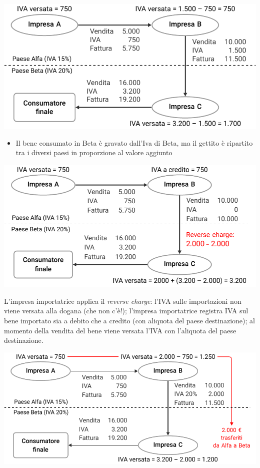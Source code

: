 \documentclass[11pt,italian]{beamer}
\begin{document}
\begin{frame}
\begin{center}
\includegraphics[width=.9\textwidth]{./figure/IVA-origine.pdf}
\end{center}

\begin{itemize}
\item Il bene consumato in Beta è gravato dall'Iva di Beta, ma il gettito è
ripartito tra i diversi paesi in proporzione al valore aggiunto
\end{itemize}
\end{frame}

\begin{frame}
\begin{center}
\includegraphics[width=.9\textwidth]{./figure/IVA-intracomunitaria.pdf}
\end{center}

\footnotesize
L'impresa importatrice applica il \emph{reverse charge}: l'IVA sulle importazioni
non viene versata alla dogana (che non c'è!); l'impresa importatrice registra
IVA sul bene importato sia a debito che a credito (con aliquota del paese
destinazione); al momento della vendita del bene viene versata l'IVA con
l'aliquota del paese destinazione.
\end{frame}


\begin{frame}
\begin{center}
\includegraphics[width=.9\textwidth]{./figure/IVA-proposta-2018.pdf}
\end{center}
\end{frame}
\end{document}
